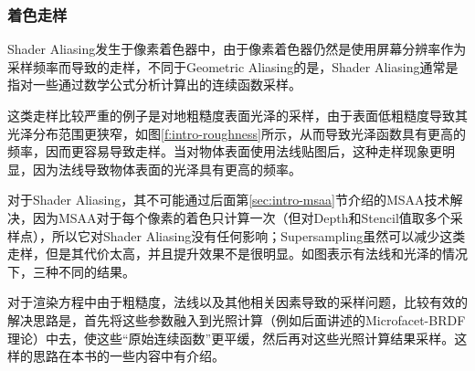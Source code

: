\subsubsection{着色走样}
Shader Aliasing发生于像素着色器中，由于像素着色器仍然是使用屏幕分辨率作为采样频率而导致的走样，不同于Geometric Aliasing的是，Shader Aliasing通常是指对一些通过数学公式分析计算出的连续函数采样。

这类走样比较严重的例子是对地粗糙度表面光泽的采样，由于表面低粗糙度导致其光泽分布范围更狭窄，如图\ref{f:intro-roughness}所示，从而导致光泽函数具有更高的频率，因而更容易导致走样。当对物体表面使用法线贴图后，这种走样现象更明显，因为法线导致物体表面的光泽具有更高的频率。

对于Shader Aliasing，其不可能通过后面第\ref{sec:intro-msaa}节介绍的MSAA技术解决，因为MSAA对于每个像素的着色只计算一次（但对Depth和Stencil值取多个采样点），所以它对Shader Aliasing没有任何影响；Supersampling虽然可以减少这类走样，但是其代价太高，并且提升效果不是很明显。如图表示有法线和光泽的情况下，三种不同的结果。

对于渲染方程中由于粗糙度，法线以及其他相关因素导致的采样问题，比较有效的解决思路是，首先将这些参数融入到光照计算（例如后面讲述的Microfacet-BRDF理论）中去，使这些“原始连续函数”更平缓，然后再对这些光照计算结果采样。这样的思路在本书的一些内容中有介绍。

